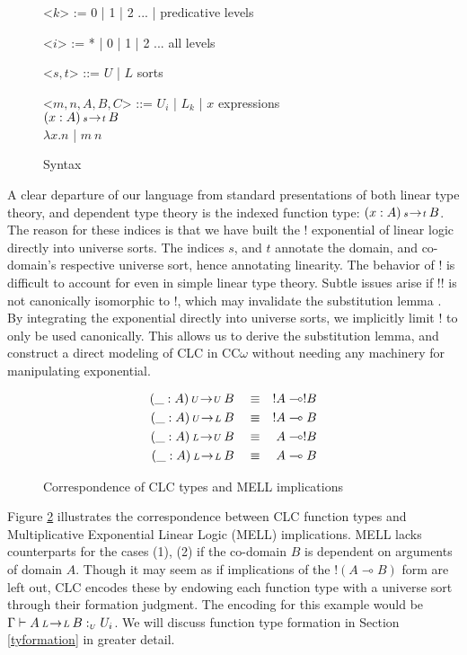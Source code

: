 \documentclass{article}
\theoremstyle{definition}
\newcommand{\indalt}[1][2]{\\\hspace*{-1.2em}\textbar\quad}
\newcommand{\utype}{:_{\scriptscriptstyle U}}
\newcommand{\arw}[2]
{\hspace*{0.2em}{\scriptstyle #1}\hspace*{-0.2em}
\rightarrow
\hspace*{-0.2em}{\scriptstyle #2}\hspace*{0.2em}}
\begin{document}
  \begin{figure}[H]
    \caption{Syntax}
    \centering
    \begin{minipage}{0.8\linewidth}
    \begin{grammar}
      <$k$> := 0 | 1 | 2 ... | \phantom{*} \hspace*{5.8em} predicative levels

      <$i$> := * | 0 | 1 | 2 ... \hspace*{5.8em} all levels

      <$s, t$> ::= $U$ | $L$ \phantom{| $x$} \hspace*{8em} sorts

      <$m, n, A, B, C$> ::= $U_i$ | $L_k$ | $x$ \hspace*{7.3em} expressions
      \indalt $(x : A) \arw{s}{t} B$
      \indalt $\lambda x. n$ | $m\ n$
    \end{grammar}
    \end{minipage}
    \label{syntax}
  \end{figure}
  A clear departure of our language from standard presentations of both linear type theory, and dependent type theory is the indexed function type: $(x : A) \arw{s}{t} B$. The reason for these indices is that we have built the ! exponential of linear logic directly into universe sorts. The indices $s$, and $t$ annotate the domain, and co-domain's respective universe sort, hence annotating linearity. The behavior of ! is difficult to account for even in simple linear type theory. Subtle issues arise if !! is not canonically isomorphic to !, which may invalidate the substitution lemma \cite{substitute}. By integrating the exponential directly into universe sorts, we implicitly limit ! to only be used canonically. This allows us to derive the substitution lemma, and construct a direct modeling of CLC in CC$\omega$ without needing any machinery for manipulating exponential.
  \begin{figure}[H]
    \caption{Correspondence of CLC types and MELL implications}
    \begin{align}
      (\_ : A) \arw{U}{U} B \quad &\equiv \quad !A \multimap !B \\
      (\_ : A) \arw{U}{L} B \quad &\equiv \quad !A \multimap B \\
      (\_ : A) \arw{L}{U} B \quad &\equiv \quad A \multimap !B \\
      (\_ : A) \arw{L}{L} B \quad &\equiv \quad A \multimap B
    \end{align}
    \label{correspondence}
  \end{figure}
  Figure \ref{correspondence} illustrates the correspondence between CLC function types and Multiplicative Exponential Linear Logic (MELL) implications. MELL lacks counterparts for the cases (1), (2) if the co-domain $B$ is dependent on arguments of domain $A$. Though it may seem as if implications of the $!(A \multimap B)$ form are left out, CLC encodes these by endowing each function type with a universe sort through their formation judgment. The encoding for this example would be $\Gamma \vdash A \arw{L}{L} B \utype U_i $. We will discuss function type formation in Section \ref{tyformation} in greater detail.
\end{document}
